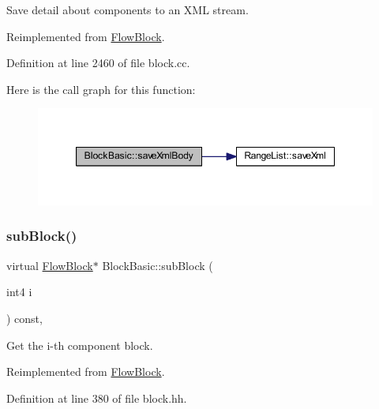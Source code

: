Save detail about components to an X\+ML stream. 



Reimplemented from \mbox{\hyperlink{class_flow_block_a05d5939fe8f00edba7320799bf3f177b}{Flow\+Block}}.



Definition at line 2460 of file block.\+cc.

Here is the call graph for this function\+:
\nopagebreak
\begin{figure}[H]
\begin{center}
\leavevmode
\includegraphics[width=347pt]{class_block_basic_aec6c3cb9b136472b012a6d39e516efaa_cgraph}
\end{center}
\end{figure}
\mbox{\label{class_block_basic_a1456fa3eb84ffa14650ff6e216eaa43d}} 
\subsubsection{\texorpdfstring{subBlock()}{subBlock()}}
{\footnotesize\ttfamily virtual \mbox{\hyperlink{class_flow_block}{Flow\+Block}}$\ast$ Block\+Basic\+::sub\+Block (\begin{DoxyParamCaption}\item[{int4}]{i }\end{DoxyParamCaption}) const\hspace{0.3cm}{\ttfamily [inline]}, {\ttfamily [virtual]}}



Get the i-\/th component block. 



Reimplemented from \mbox{\hyperlink{class_flow_block_a42070515fd8db6cc23916b359e259f4e}{Flow\+Block}}.



Definition at line 380 of file block.\+hh.

\mbox{\label{class_block_basic_a71442a96a2278c3b88c8027f4b1444c9}} 
